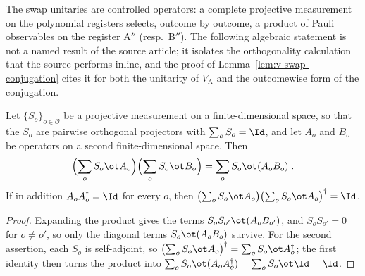 The swap unitaries are controlled operators: a complete projective
measurement on the polynomial registers selects, outcome by outcome, a product
of Pauli observables on the register $\mathrm{A}''$ (resp.\ $\mathrm{B}''$).
The following algebraic statement is not a named result of the source article;
it isolates the orthogonality calculation that the source performs inline, and
the proof of Lemma~\ref{lem:v-swap-conjugation} cites it for both the unitarity
of $V_{\mathrm{A}}$ and the outcomewise form of the conjugation.

\begin{lemma}
	\label{lem:controlled-sum-support}
	\leanok
	Let $\{S_o\}_{o \in \mathcal{O}}$ be a projective measurement on a
	finite-dimensional space, so that the $S_o$ are pairwise orthogonal
	projectors with $\sum_o S_o = \Id$, and let $A_o$ and $B_o$ be operators on
	a second finite-dimensional space. Then
	\[
		\Bigl(\sum_o S_o \ot A_o\Bigr) \Bigl(\sum_o S_o \ot B_o\Bigr)
		= \sum_o S_o \ot (A_o B_o)\;.
	\]
	If in addition $A_o A_o^\dagger = \Id$ for every $o$, then
	$\bigl(\sum_o S_o \ot A_o\bigr) \bigl(\sum_o S_o \ot A_o\bigr)^\dagger
	= \Id$.
\end{lemma}
\begin{proof}
	\leanok
	Expanding the product gives the terms $S_o S_{o'} \ot (A_o B_{o'})$, and
	$S_o S_{o'} = 0$ for $o \ne o'$, so only the diagonal terms
	$S_o \ot (A_o B_o)$ survive. For the second assertion, each $S_o$ is
	self-adjoint, so $\bigl(\sum_o S_o \ot A_o\bigr)^\dagger
	= \sum_o S_o \ot A_o^\dagger$; the first identity then turns the product
	into $\sum_o S_o \ot (A_o A_o^\dagger) = \sum_o S_o \ot \Id = \Id$.
\end{proof}

